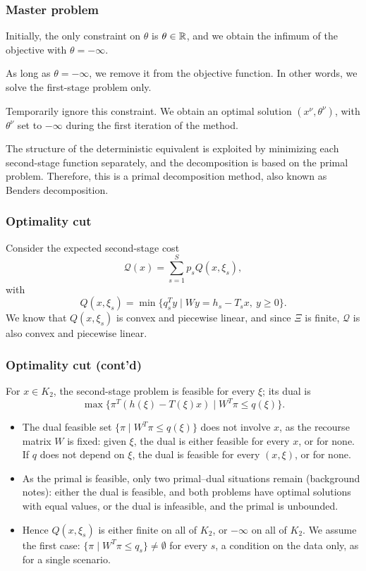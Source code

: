 \documentclass[aspectratio=169]{beamer}
\begin{document}
\begin{frame}
\frametitle{Master problem}
	
Initially, the only constraint on $\theta$ is $\theta \in {\mathbb{R}}$, and we obtain the infimum of the objective with $\theta = -\infty$.	


\mbox{}

As long as $\theta = -\infty$, we remove it from the objective function.
In other words, we solve the first-stage problem only.

\mbox{}

{\blue Temporarily ignore} this constraint.
We obtain an optimal solution $(x^{\nu}, \theta^{\nu})$, with $\theta^{\nu}$ set to $-\infty$ during the first iteration of the method.

\mbox{}

The structure of the deterministic equivalent is exploited by minimizing each second-stage function separately, and the decomposition is based on the primal problem.
Therefore, this is a primal decomposition method, also known as Benders decomposition.

\end{frame}

\begin{frame}
\frametitle{Optimality cut}
	
Consider the expected second-stage cost
\[
\mathcal{Q}(x) = \sum_{s=1}^S p_sQ(x,\xi_s),
\]
with
\[
Q(x,\xi_s) = \min \lbrace q_s^Ty \mid Wy = h_s-T_sx,\ y \geq 0 \rbrace.
\]
We know that $Q(x,\xi_s)$ is convex and piecewise linear, and since $\Xi$ is finite, $\mathcal{Q}$ is also convex and piecewise linear.
	
\end{frame}

\begin{frame}
	\frametitle{Optimality cut (cont'd)}
	
	For $x \in K_2$, {\red the second-stage problem is feasible} for every $\xi$; its dual is
	\[
	\max \lbrace \pi^T(h(\xi)-T(\xi)x) \mid W^T\pi \leq q(\xi) \rbrace.
	\]

	\begin{itemize}
		\item
		The dual feasible set $\lbrace \pi \mid W^T\pi \leq q(\xi) \rbrace$ does not involve $x$, as the recourse matrix $W$ is fixed: given $\xi$, the dual is either feasible for every $x$, or for none.
		If $q$ does not depend on $\xi$, the dual is feasible for every $(x, \xi)$, or for none.
		\item
		As the primal is feasible, only two primal--dual situations remain (background notes): either the dual is feasible, and both problems have optimal solutions with equal values, or the dual is infeasible, and the primal is unbounded.
		\item
		Hence $Q(x,\xi_s)$ is either finite on all of $K_2$, or $-\infty$ on all of $K_2$.
		We assume the first case: $\lbrace \pi \mid W^T\pi \leq q_s \rbrace \ne \emptyset$ for every $s$, a condition on the data only, as for a single scenario.
	\end{itemize}
	
\end{frame}
\end{document}
